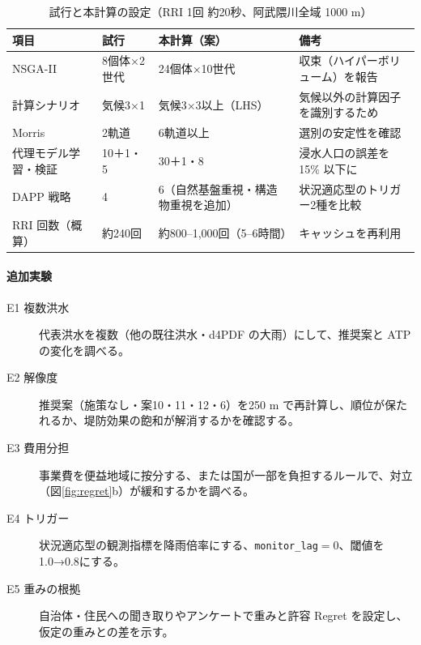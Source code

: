 \documentclass[a4paper,10pt]{ltjsarticle}
\begin{document}
\begin{table}[H]
\centering\small
\caption{試行と本計算の設定（RRI 1回 約20秒、阿武隈川全域 1000 m）}
\begin{tabularx}{\linewidth}{@{}lllX@{}}
\toprule
項目 & 試行 & 本計算（案） & 備考 \\
\midrule
NSGA-II & 8個体×2世代 & 24個体×10世代 & 収束（ハイパーボリューム）を報告 \\
計算シナリオ & 気候3×1 & 気候3×3以上（LHS） & 気候以外の計算因子を識別するため \\
Morris & 2軌道 & 6軌道以上 & 選別の安定性を確認 \\
代理モデル学習・検証 & 10＋1・5 & 30＋1・8 & 浸水人口の誤差を 15\% 以下に \\
DAPP 戦略 & 4 & 6（自然基盤重視・構造物重視を追加） & 状況適応型のトリガー2種を比較 \\
RRI 回数（概算） & 約240回 & 約800–1,000回（5–6時間） & キャッシュを再利用 \\
\bottomrule
\end{tabularx}
\end{table}

\paragraph{追加実験}
\begin{description}
\item[E1 複数洪水] 代表洪水を複数（他の既往洪水・d4PDF の大雨）にして、推奨案と ATP の変化を調べる。
\item[E2 解像度] 推奨案（施策なし・案10・11・12・6）を250 m で再計算し、順位が保たれるか、堤防効果の飽和が解消するかを確認する。
\item[E3 費用分担] 事業費を便益地域に按分する、または国が一部を負担するルールで、対立（図\ref{fig:regret}b）が緩和するかを調べる。
\item[E4 トリガー] 状況適応型の観測指標を降雨倍率にする、\texttt{monitor\_lag}$=0$、閾値を1.0→0.8にする。
\item[E5 重みの根拠] 自治体・住民への聞き取りやアンケートで重みと許容 Regret を設定し、仮定の重みとの差を示す。
\end{description}

\end{document}
